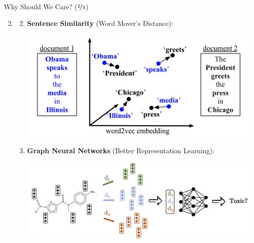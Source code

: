 \documentclass{beamer}
\begin{document}
\begin{frame}{Why Should We Care? ($\nicefrac{2}{3}$)}
	\begin{enumerate}[label=\arabic*.]
		\setcounter{enumi}{1}
		\item
			\begin{enumerate}[label=\alph*.]
				\setcounter{enumii}{1}
				\item \textbf{Sentence Similarity} (Word Mover's Distance):
					\begin{center}
						\includegraphics[width=.6\textwidth]{img/wmd.png}
					\end{center} \pause
				\item \textbf{Graph Neural Networks} (Better Representation Learning):
					\begin{center}
						\includegraphics[width=.7\textwidth]{img/gnn.png}
					\end{center}
			\end{enumerate}
	\end{enumerate}
\end{frame}
\end{document}
